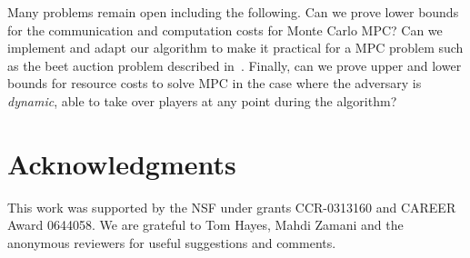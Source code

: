 \documentclass[10pt]{llncs}
\begin{document}
Many problems remain open including the following. Can we prove lower
bounds for the communication and computation costs for Monte Carlo
MPC?  Can we implement and adapt our algorithm to make it practical
for a MPC problem such as the beet auction problem described
in~\cite{bogetoft2009secure}.  Finally, can we prove upper and lower
bounds for resource costs to solve MPC in the case where the adversary
is \emph{dynamic}, able to take over players at any point during the
algorithm?

\section{Acknowledgments}

This work was supported by the NSF under grants CCR-0313160 and CAREER Award 
0644058. We are grateful to Tom Hayes, Mahdi Zamani and the anonymous 
reviewers for useful suggestions and comments.






\end{document}
